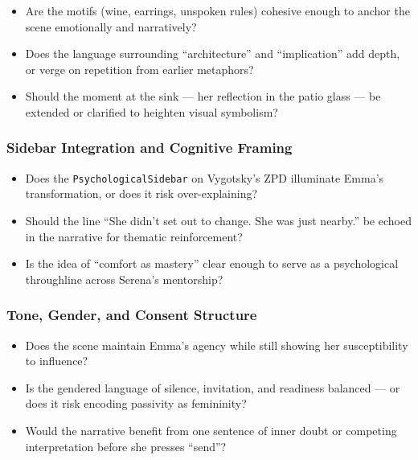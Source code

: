 \begin{itemize}
  \item Are the motifs (wine, earrings, unspoken rules) cohesive enough to anchor the scene emotionally and narratively?
  \item Does the language surrounding “architecture” and “implication” add depth, or verge on repetition from earlier metaphors?
  \item Should the moment at the sink — her reflection in the patio glass — be extended or clarified to heighten visual symbolism?
\end{itemize}

\subsubsection*{Sidebar Integration and Cognitive Framing}

\begin{itemize}
  \item Does the \texttt{PsychologicalSidebar} on Vygotsky’s ZPD illuminate Emma’s transformation, or does it risk over-explaining?
  \item Should the line ``She didn’t set out to change. She was just nearby.'' be echoed in the narrative for thematic reinforcement?
  \item Is the idea of ``comfort as mastery'' clear enough to serve as a psychological throughline across Serena’s mentorship?
\end{itemize}

\subsubsection*{Tone, Gender, and Consent Structure}

\begin{itemize}
  \item Does the scene maintain Emma’s agency while still showing her susceptibility to influence?
  \item Is the gendered language of silence, invitation, and readiness balanced — or does it risk encoding passivity as femininity?
  \item Would the narrative benefit from one sentence of inner doubt or competing interpretation before she presses “send”?
\end{itemize}
